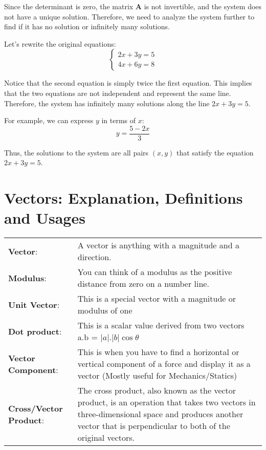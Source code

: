\documentclass[a4paper,12pt]{article}
\begin{document}
\begin{itemize}[leftmargin=*]
Since the determinant is zero, the matrix \( \mathbf{A} \) is not invertible, and the system does not have a unique solution. Therefore, we need to analyze the system further to find if it has no solution or infinitely many solutions.

Let's rewrite the original equations:
\[
\begin{cases}
2x + 3y = 5 \\
4x + 6y = 8
\end{cases}
\]

Notice that the second equation is simply twice the first equation. This implies that the two equations are not independent and represent the same line. Therefore, the system has infinitely many solutions along the line \(2x + 3y = 5\).

For example, we can express \( y \) in terms of \( x \):
\[
y = \frac{5 - 2x}{3}
\]

Thus, the solutions to the system are all pairs \((x, y)\) that satisfy the equation \(2x + 3y = 5\).

    \end{itemize}
    
\section{Vectors: Explanation, Definitions and Usages}
\begin{tabularx}{\linewidth}{@{}l X@{}}
\textbf{Vector}: &  \normalsize{A vector is anything with a magnitude and a direction.}\\
\textbf{Modulus}: &  \normalsize{You can think of a modulus as the positive distance from zero on a number line.}\\
\textbf{Unit Vector}: & \normalsize{This is a special vector with a magnitude or modulus of one}\\
\textbf{Dot product}: & \normalsize{This is a scalar value derived from two vectors a.b = \(|a|.|b|\)\( \cos\theta \)}\\
\textbf{Vector Component}: & \normalsize{This is when you have to find a horizontal or vertical component of a force and display it as a vector (Mostly useful for Mechanics/Statics)}\\
\textbf{Cross/Vector Product}: & \normalsize{The cross product, also known as the vector product, is an operation that takes two vectors in three-dimensional space and produces another vector that is perpendicular to both of the original vectors.}

\end{tabularx}
\end{document}
